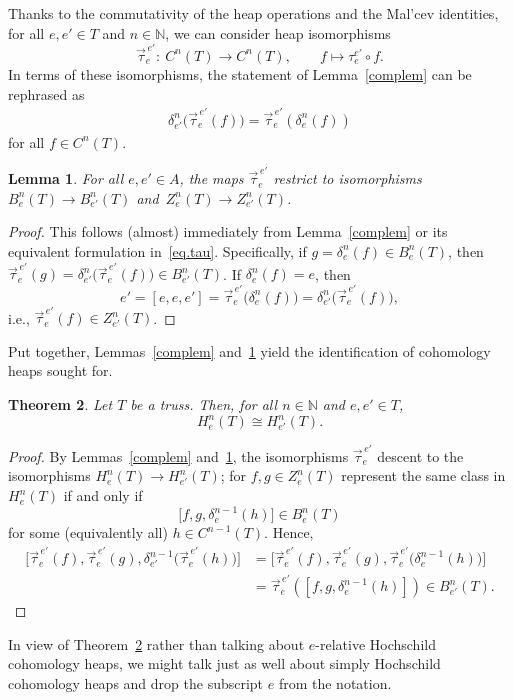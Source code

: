 \documentclass[10pt,a4paper]{amsart}
\numberwithin{equation}{section}
\newtheorem{Theorem}{Theorem}[section]
\newtheorem{Lemma}[Theorem]{Lemma}
\newcommand{\N}{\mathbb N}
\begin{document}
Thanks to the commutativity of the heap operations and the Mal'cev identities, for all ${e,e'\in T}$ and $n\in \N$, we can consider heap isomorphisms
\[
\vec{\tau}_e^{\,e'}\colon\ C^n(T)\to C^n(T), \qquad f\mapsto \tau_e^{e'}\circ f.
\]
In terms of these isomorphisms, the statement of Lemma~\ref{complem} can be rephrased as
\begin{gather}\label{eq.tau}
 \delta_{e'}^n \big(\vec{\tau}_e^{\,e'}(f)\big) = \vec{\tau}_e^{\,e'}(\delta_e^n(f))
\end{gather}
for all $f\in C^n(T)$.
\begin{Lemma}\label{lem.b.z}
For all $e,e' \in A$, the maps $\vec{\tau}_e^{\,e'}$ restrict to isomorphisms $B^n_e(T) \to B^n_{e'}(T)$ and~$Z^n_e(T) \to Z^n_{e'}(T)$.
\end{Lemma}
\begin{proof}
This follows (almost) immediately from Lemma~\ref{complem} or its equivalent formulation in~\eqref{eq.tau}. Specifically, if $g = \delta_e^n(f)\in B_e^n(T)$, then
$\vec{\tau}_e^{\,e'}(g) = \delta_{e'}^n\big(\vec{\tau}_e^{\,e'}(f)\big) \in B_{e'}^n(T)$. If $\delta_e^n(f) = e$, then
\[e' = [e,e,e'] = \vec{\tau}_e^{\,e'}\big(\delta_e^n(f)\big) = \delta^{n}_{e'}\big(\vec{\tau}_e^{\,e'}(f)\big),
\]
i.e., $\vec{\tau}_e^{\,e'}(f)\in Z_{e'}^n(T)$.
\end{proof}


Put together, Lemmas~\ref{complem} and~\ref{lem.b.z} yield the identification of cohomology heaps sought for.
\begin{Theorem}\label{thm.Hoch}
 Let $T$ be a truss. Then, for all $n\in \N$ and $e,e'\in T$,
 \[
 H^n_e(T) \cong H^n_{e'}(T).
 \]
\end{Theorem}
\begin{proof}
 By Lemmas~\ref{complem} and~\ref{lem.b.z}, the isomorphisms $\vec{\tau}_e^{\,e'}$ descent to the isomorphisms $H^n_e(T)\to H^n_{e'}(T)$; for $f,g\in Z_e^n(T)$ represent the same class in $H_e^n(T)$ if and only if
 \[\big[f,g,\delta^{n-1}_e(h)\big] \in B_e^n(T)\]
 for some (equivalently all) $h\in C^{n-1}(T)$. Hence,
 \begin{align*}
 \big[\vec{\tau}_e^{\,e'}(f),\vec{\tau}_e^{\,e'}(g),\delta^{n-1}_{e'}\big(\vec{\tau}_e^{\,e'}(h)\big)\big] &=\big[\vec{\tau}_e^{\,e'}(f),\vec{\tau}_e^{\,e'}(g),\vec{\tau}_e^{\,e'}\big(\delta_e^{n-1}(h)\big)\big]\\
 &= \vec{\tau}_e^{\,e'}\left(\left[f,g,\delta_e^{n-1}(h)\right]\right)\in B_{e'}^n(T).\tag*{\qed}
 \end{align*}\renewcommand{\qed}{}
\end{proof}
In view of Theorem~\ref{thm.Hoch} rather than talking about $e$-relative Hochschild cohomology heaps, we might talk just as well about simply Hochschild cohomology heaps and drop the subscript $e$ from the notation.
\end{document}
